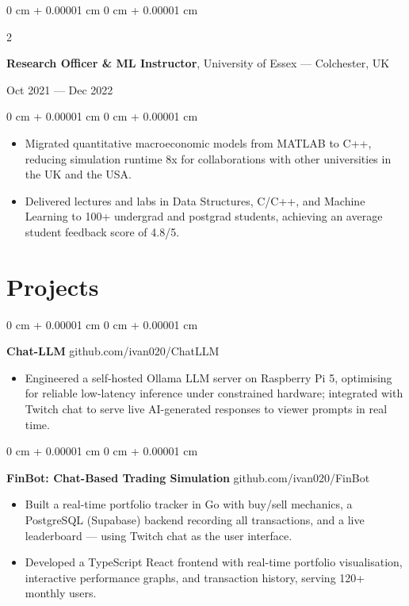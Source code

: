 \documentclass[6pt, letterpaper]{article}
\newenvironment{highlights}{
    \begin{itemize}[
        topsep=0.03 cm,
        parsep=0.03 cm,
        partopsep=0pt,
        itemsep=0pt,
        leftmargin=0 cm + 10pt
    ]
}{
    \end{itemize}
} %
\newenvironment{onecolentry}{
    \begin{adjustwidth}{
        0 cm + 0.00001 cm
    }{
        0 cm + 0.00001 cm
    }
}{
    \end{adjustwidth}
} %
\newenvironment{twocolentry}[2][]{
    \onecolentry
    \def\secondColumn{#2}
    \setcolumnwidth{\fill, 4.5 cm}
    \begin{paracol}{2}
}{
    \switchcolumn \raggedleft \secondColumn
    \end{paracol}
    \endonecolentry
} %
\begin{document}
        \begin{twocolentry}{Oct 2021 --- Dec 2022}
        \textbf{Research Officer \& ML Instructor}, University of Essex --- Colchester, UK
        \end{twocolentry}

        \begin{onecolentry}
        \begin{highlights}
        \item Migrated quantitative macroeconomic models from MATLAB to C++, reducing simulation runtime 8x for collaborations with other universities in the UK and the USA.
        \item Delivered lectures and labs in Data Structures, C/C++, and Machine Learning to 100+ undergrad and postgrad students, achieving an average student feedback score of 4.8/5.
        \end{highlights}
        \end{onecolentry}


    \section{Projects}

    \begin{onecolentry}
        \textbf{Chat-LLM} \hfill github.com/ivan020/ChatLLM

        \begin{highlights}

        \item Engineered a self-hosted Ollama LLM server on Raspberry Pi 5, optimising for reliable low-latency inference under constrained hardware; integrated with Twitch chat to serve live AI-generated responses to viewer prompts in real time.

        \end{highlights}
    \end{onecolentry}

    \begin{onecolentry}
        \textbf{FinBot: Chat-Based Trading Simulation} \hfill github.com/ivan020/FinBot

        \begin{highlights}

            \item Built a real-time portfolio tracker in Go with buy/sell mechanics, a PostgreSQL (Supabase) backend recording all transactions, and a live leaderboard — using Twitch chat as the user interface.
            \item Developed a TypeScript React frontend with real-time portfolio visualisation, interactive performance graphs, and transaction history, serving 120+ monthly users.

        \end{highlights}
    \end{onecolentry}
\end{document}
